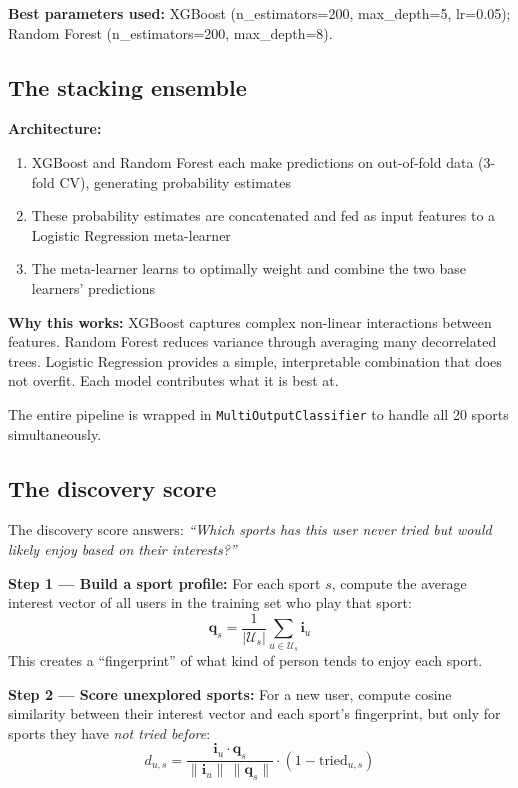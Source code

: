 \documentclass[12pt,a4paper]{article}
\begin{document}
\textbf{Best parameters used:} XGBoost (n\_estimators=200, max\_depth=5,
lr=0.05); Random Forest (n\_estimators=200, max\_depth=8).

\subsection{The stacking ensemble}

\begin{keybox}
\textbf{Architecture:}
\begin{enumerate}
\item XGBoost and Random Forest each make predictions on out-of-fold data
(3-fold CV), generating probability estimates
\item These probability estimates are concatenated and fed as input features
to a Logistic Regression meta-learner
\item The meta-learner learns to optimally weight and combine the two base
learners' predictions
\end{enumerate}
\textbf{Why this works:} XGBoost captures complex non-linear interactions
between features. Random Forest reduces variance through averaging many
decorrelated trees. Logistic Regression provides a simple, interpretable
combination that does not overfit. Each model contributes what it is
best at.
\end{keybox}

The entire pipeline is wrapped in \texttt{MultiOutputClassifier} to handle
all 20 sports simultaneously.

\subsection{The discovery score}

The discovery score answers: \textit{``Which sports has this user never tried
but would likely enjoy based on their interests?''}

\textbf{Step 1 --- Build a sport profile:} For each sport $s$, compute the
average interest vector of all users in the training set who play that sport:
\[
\mathbf{q}_s = \frac{1}{|\mathcal{U}_s|} \sum_{u \in \mathcal{U}_s} \mathbf{i}_u
\]
This creates a ``fingerprint'' of what kind of person tends to enjoy each sport.

\textbf{Step 2 --- Score unexplored sports:} For a new user, compute cosine
similarity between their interest vector and each sport's fingerprint, but
only for sports they have \emph{not tried before}:
\[
d_{u,s} = \frac{\mathbf{i}_u \cdot \mathbf{q}_s}{\|\mathbf{i}_u\|\,\|\mathbf{q}_s\|}
           \cdot (1 - \text{tried}_{u,s})
\]
\end{document}
